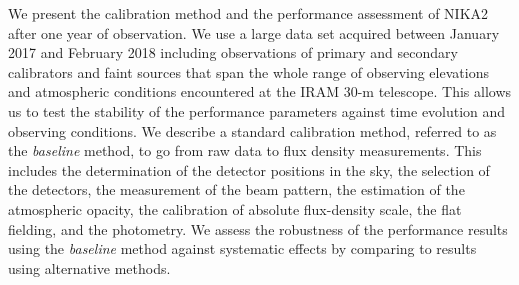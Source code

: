 \documentclass[traditionalabstract]{aa}
\newcommand{\lp}[1]{#1}
\begin{document}
       {We present {\lp the calibration method} and the performance assessment of NIKA2 after one year of observation.}
       {We use a large data set acquired between January 2017 and
         February 2018 including observations of primary and secondary
         calibrators and faint sources that span the whole range
         of observing elevations and atmospheric conditions encountered at the
         IRAM 30-m telescope. This allows us to test the stability of the
         performance parameters against time evolution and
         observing conditions. {\lp We describe a standard calibration
         method, referred to as the \emph{baseline} method, to go from
         raw data to flux density measurements. This includes the
         determination of the detector positions in the sky, the
         selection of the detectors, the measurement of
         the beam pattern, the estimation of the 
         atmospheric opacity, the calibration of absolute flux-density
         scale, the flat fielding, and the photometry. We
         assess the robustness of the performance results using the
         \emph{baseline} method against systematic effects by
         comparing to results using alternative methods.}  
       }
\end{document}
